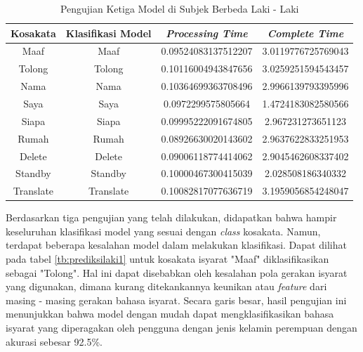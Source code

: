 \begin{longtable}{|c|c|c|c|}
  \caption{Pengujian Ketiga Model di Subjek Berbeda Laki - Laki}
  \label{tb:prediksilaki3}                                   \\
  \hline
  \rowcolor[HTML]{C0C0C0}
  \textbf{Kosakata} & \textbf{Klasifikasi Model} & \textbf{\emph{Processing Time}} & \textbf{\emph{Complete Time}}\\
  \hline
  Maaf              & Maaf                        & 0.09524083137512207                           & 3.0119776725769043                                  \\
  Tolong            & Tolong                        & 0.10116004943847656                           & 3.0259251594543457                                  \\
  Nama              & Nama                        & 0.10364699363708496                           & 2.9966139793395996                                  \\
  Saya              & Saya                        & 0.0972299575805664                           & 1.4724183082580566                                  \\
  Siapa              & Siapa                        & 0.09995222091674805                           & 2.967231273651123                                  \\
  Rumah             & Rumah                        & 0.08926630020143602                           & 2.9637622833251953                                  \\
  Delete            & Delete                        & 0.09006118774414062                           & 2.9045462608337402                                  \\
  Standby           & Standby                        & 0.10000467300415039                           & 2.028508186340332                                  \\
  Translate         & Translate                        & 0.10082817077636719                           & 3.1959056854248047                                  \\
  \hline
\end{longtable}

Berdasarkan tiga pengujian yang telah dilakukan, didapatkan bahwa hampir keseluruhan klasifikasi model yang sesuai dengan \emph{class} kosakata. Namun, terdapat beberapa kesalahan model dalam melakukan klasifikasi. Dapat dilihat pada tabel \ref{tb:prediksilaki1} untuk kosakata isyarat "Maaf" diklasifikasikan sebagai "Tolong". Hal ini dapat disebabkan oleh kesalahan pola gerakan isyarat yang digunakan, dimana kurang ditekankannya keunikan atau \emph{feature} dari masing - masing gerakan bahasa isyarat.  Secara garis besar, hasil pengujian ini menunjukkan bahwa model dengan mudah dapat mengklasifikasikan bahasa isyarat yang diperagakan oleh pengguna dengan jenis kelamin perempuan dengan akurasi sebesar 92.5\%. 

